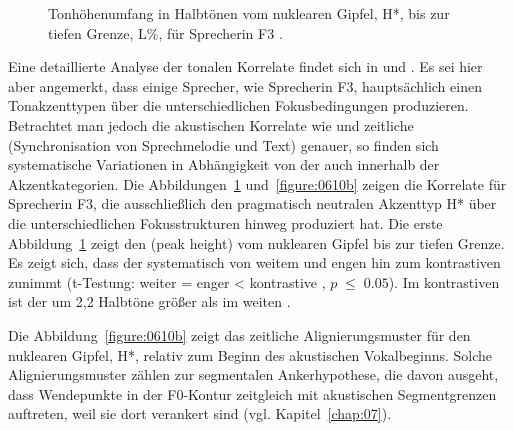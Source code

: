 \begin{figure}
	\caption{Tonhöhenumfang in Halbtönen vom nuklearen Gipfel, H*, bis zur tiefen Grenze, L\%, für Sprecherin F3 \citep[adaptiert von][]{Krüger2009}.}
	\label{figure:0610a}
\end{figure}



Eine detaillierte Analyse der tonalen Korrelate findet sich in \citet{Krüger2009} und \citet{Grice2017}. Es sei hier aber angemerkt, dass einige Sprecher, wie Sprecherin F3, hauptsächlich einen Tonakzenttypen über die unterschiedlichen Fokusbedingungen produzieren. Betrachtet man jedoch die akustischen Korrelate wie  und zeitliche  (Synchronisation von Sprechmelodie und Text) genauer, so finden sich systematische Variationen in Abhängigkeit von der  auch innerhalb der Akzentkategorien. Die Abbildungen~\ref{figure:0610a} und~\ref{figure:0610b} zeigen die Korrelate für Sprecherin F3, die ausschließlich den pragmatisch neutralen Akzenttyp H* über die unterschiedlichen Fokusstrukturen hinweg produziert hat. Die erste Abbildung~\ref{figure:0610a} zeigt den  (peak height) vom nuklearen Gipfel bis zur tiefen Grenze. Es zeigt sich, dass der  systematisch von weitem und engen  hin zum kontrastiven  zunimmt (t-Testung: weiter  = enger  < kontrastive , $p\;\leq\;0.05$). Im kontrastiven  ist der  um 2,2 Halbtöne größer als im weiten .




Die Abbildung~\ref{figure:0610b} zeigt das zeitliche Alignierungsmuster für den nuklearen Gipfel, H*, relativ zum Beginn des akustischen Vokalbeginns. Solche Alignierungsmuster zählen zur segmentalen Ankerhypothese, die davon ausgeht, dass Wendepunkte in der F0-Kontur zeitgleich mit akustischen Segmentgrenzen auftreten, weil sie dort verankert sind (vgl. Kapitel~\ref{chap:07}). 

